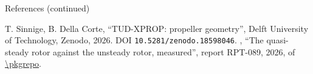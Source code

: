 \documentclass[aspectratio=169,11pt]{beamer}
\begin{document}
\begin{frame}{References (continued)}
\begin{reflist}
  \setcounter{enumi}{17}
   \smiref
   T. Sinnige, B. Della Corte, ``TUD-XPROP: propeller geometry'',
        Delft University of Technology, Zenodo, 2026. DOI
        \texttt{10.5281/zenodo.18598046}.
   \pkgauthor, ``The quasi-steady rotor against the unsteady rotor,
        measured'', report RPT-089, 2026,  of \url{\pkgrepo}.
   
   
\end{reflist}
\end{frame}
\end{document}
